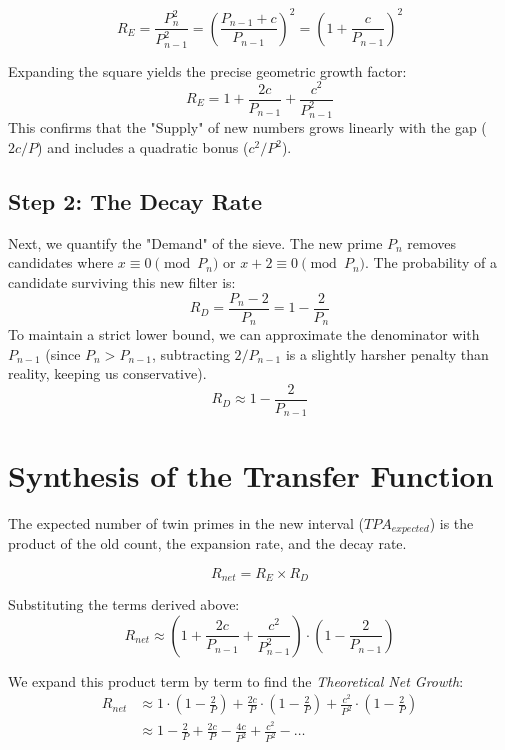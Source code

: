 \documentclass[sn-mathphys-num, pdflatex]{sn-jnl}
\begin{document}
\begin{equation}
    R_E = \frac{P_n^2}{P_{n-1}^2} = \left( \frac{P_{n-1} + c}{P_{n-1}} \right)^2 = \left( 1 + \frac{c}{P_{n-1}} \right)^2
\end{equation}

Expanding the square yields the precise geometric growth factor:
\begin{equation}
    R_E = 1 + \frac{2c}{P_{n-1}} + \frac{c^2}{P_{n-1}^2}
\end{equation}
This confirms that the "Supply" of new numbers grows linearly with the gap ($2c/P$) and includes a quadratic bonus ($c^2/P^2$).

\subsection{Step 2: The Decay Rate}
Next, we quantify the "Demand" of the sieve.
The new prime $P_n$ removes candidates where $x \equiv 0 \pmod{P_n}$ or $x+2 \equiv 0 \pmod{P_n}$.
The probability of a candidate surviving this new filter is:
\begin{equation}
    R_D = \frac{P_n - 2}{P_n} = 1 - \frac{2}{P_n}
\end{equation}
To maintain a strict lower bound, we can approximate the denominator with $P_{n-1}$ (since $P_n > P_{n-1}$, subtracting $2/P_{n-1}$ is a slightly harsher penalty than reality, keeping us conservative).
\begin{equation}
    R_D \approx 1 - \frac{2}{P_{n-1}}
\end{equation}

\section{Synthesis of the Transfer Function}

The expected number of twin primes in the new interval ($TPA_{expected}$) is the product of the old count, the expansion rate, and the decay rate.

\begin{equation}
    R_{net} = R_E \times R_D
\end{equation}

Substituting the terms derived above:
\begin{equation}
    R_{net} \approx \left( 1 + \frac{2c}{P_{n-1}} + \frac{c^2}{P_{n-1}^2} \right) \cdot \left( 1 - \frac{2}{P_{n-1}} \right)
\end{equation}

We expand this product term by term to find the \textit{Theoretical Net Growth}:
\begin{align}
    R_{net} &\approx 1 \cdot \left(1 - \frac{2}{P}\right) + \frac{2c}{P} \cdot \left(1 - \frac{2}{P}\right) + \frac{c^2}{P^2} \cdot \left(1 - \frac{2}{P}\right) \\
    &\approx 1 - \frac{2}{P} + \frac{2c}{P} - \frac{4c}{P^2} + \frac{c^2}{P^2} - \dots
\end{align}
\end{document}
